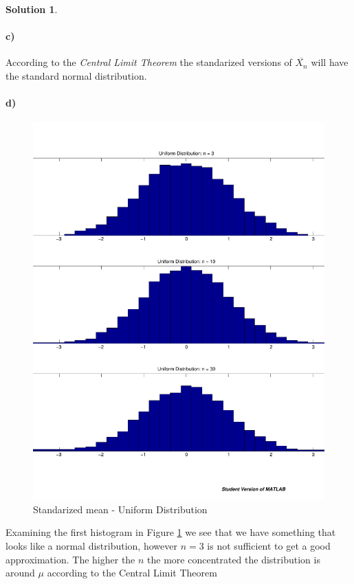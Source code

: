 \documentclass[a4paper, fleqn]{amsart}
\theoremstyle{definition}
\newtheorem{sltn}{Solution}
\begin{document}
\begin{sltn}
\paragraph{c)}

According to the \textit{Central Limit Theorem} the standarized versions of
$\overline{X_n}$ will have the standard normal distribution.
\\
\paragraph{d)}
\begin{figure}[p]
  \centering
  \includegraphics[scale=0.4]{uniform_mean}
  \caption{Standarized mean - Uniform Distribution}
  \label{fig:uniform_mean}
\end{figure}

Examining the first histogram in Figure \ref{fig:uniform_mean} we see that we
have something that looks like a normal distribution, however $n = 3$ is not
sufficient to get a good approximation. The higher the $n$ the more
concentrated the distribution is around $\mu$ according to the Central Limit Theorem
\\

\end{sltn}
\end{document}

